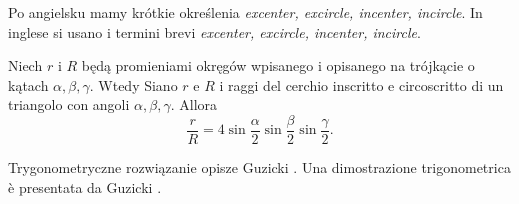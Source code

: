 Po angielsku mamy krótkie określenia \emph{excenter, excircle, incenter, incircle}. %
In inglese si usano i termini brevi \emph{excenter, excircle, incenter, incircle}. %


\begin{proposition}
    Niech $r$ i $R$ będą promieniami okręgów wpisanego i opisanego na trójkącie o kątach $\alpha, \beta, \gamma$. %
    Wtedy %
    Siano $r$ e $R$ i raggi del cerchio inscritto e circoscritto di un triangolo con angoli $\alpha, \beta, \gamma$. %
    Allora %
    \begin{equation}
        \frac r R = 4 \sin \frac \alpha 2 \sin \frac \beta 2 \sin \frac \gamma 2.
    \end{equation}
\end{proposition}

Trygonometryczne rozwiązanie opisze Guzicki \cite[s. 351]{guzicki_2021}. %
Una dimostrazione trigonometrica è presentata da Guzicki \cite[p. 351]{guzicki_2021}. %

%